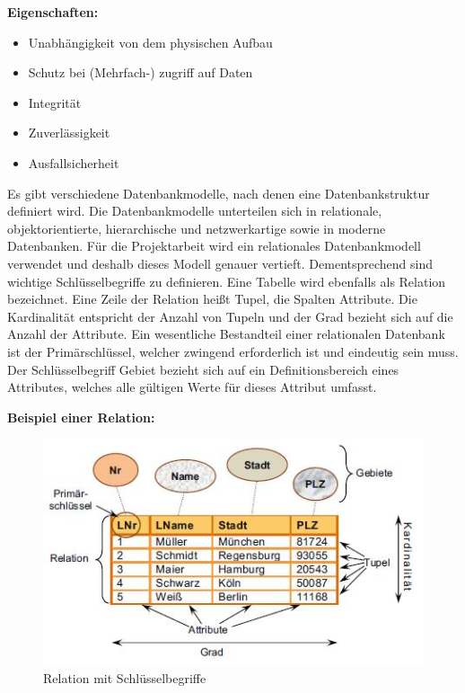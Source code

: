 \documentclass[a4paper,titlepage,halfparskip,12pt]{scrreprt}
\begin{document}
\begin{onehalfspacing}
\smallskip

\textbf{Eigenschaften:}
\begin{itemize}
	\item Unabhängigkeit von dem physischen Aufbau
	\item Schutz bei (Mehrfach-) zugriff auf Daten
	\item Integrität
	\item Zuverlässigkeit
	\item Ausfallsicherheit
\end{itemize}

Es gibt verschiedene Datenbankmodelle, nach denen eine Datenbankstruktur definiert wird. Die Datenbankmodelle unterteilen sich in relationale, objektorientierte, hierarchische und netzwerkartige sowie in moderne Datenbanken. Für die Projektarbeit wird ein relationales Datenbankmodell verwendet und deshalb dieses Modell genauer vertieft. Dementsprechend sind wichtige Schlüsselbegriffe zu definieren. Eine Tabelle wird ebenfalls als Relation bezeichnet. Eine Zeile der Relation heißt Tupel, die Spalten Attribute. Die Kardinalität entspricht der Anzahl von Tupeln und der Grad bezieht sich auf die Anzahl der Attribute. Ein wesentliche Bestandteil einer relationalen Datenbank ist der Primärschlüssel, welcher zwingend erforderlich ist und eindeutig sein muss. Der Schlüsselbegriff Gebiet bezieht sich auf ein Definitionsbereich eines Attributes, welches alle gültigen Werte für dieses Attribut umfasst. \cite{Schicker2017}

\textbf{Beispiel einer Relation:}

\smallskip

\begin{figure}[h]
	\centering
	\includegraphics[scale=1.2]{images/RelationMitSchluesselbegriffe}
	\caption{Relation mit Schlüsselbegriffe \cite{Schicker2017}}
	\label{img:RelationDB_Begriffe}
\end{figure}


\end{onehalfspacing}
\end{document}
